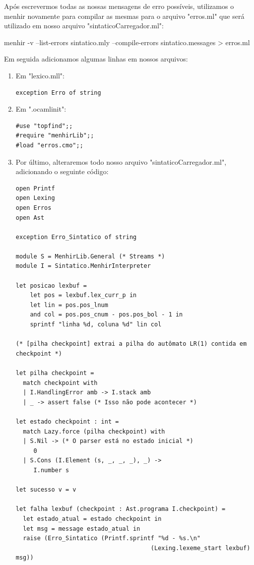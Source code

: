 \documentclass[12pt,a4paper,twoside]{report}
\begin{document}
Após escrevermos todas as nossas mensagens de erro possíveis, utilizamos o menhir novamente para compilar as mesmas para o arquivo "erros.ml" que será utilizado em nosso arquivo "sintaticoCarregador.ml":

\begin{terminal}
menhir -v --list-errors sintatico.mly --compile-errors sintatico.messages > erros.ml
\end{terminal}

Em seguida adicionamos algumas linhas em nossos arquivos:

\begin{enumerate}
\item Em "lexico.mll":
\begin{verbatim}
exception Erro of string
\end{verbatim}

\item Em ".ocamlinit":
\begin{verbatim}
#use "topfind";;
#require "menhirLib";;
#load "erros.cmo";;
\end{verbatim}

\item Por último, alteraremos todo nosso arquivo "sintaticoCarregador.ml", adicionando o seguinte código:

\begin{verbatim}
open Printf
open Lexing
open Erros
open Ast

exception Erro_Sintatico of string
    
module S = MenhirLib.General (* Streams *)
module I = Sintatico.MenhirInterpreter

let posicao lexbuf =
    let pos = lexbuf.lex_curr_p in
    let lin = pos.pos_lnum
    and col = pos.pos_cnum - pos.pos_bol - 1 in
    sprintf "linha %d, coluna %d" lin col

(* [pilha checkpoint] extrai a pilha do autômato LR(1) contida em checkpoint *)

let pilha checkpoint =
  match checkpoint with
  | I.HandlingError amb -> I.stack amb
  | _ -> assert false (* Isso não pode acontecer *)

let estado checkpoint : int =
  match Lazy.force (pilha checkpoint) with
  | S.Nil -> (* O parser está no estado inicial *)
     0
  | S.Cons (I.Element (s, _, _, _), _) ->
     I.number s

let sucesso v = v

let falha lexbuf (checkpoint : Ast.programa I.checkpoint) =
  let estado_atual = estado checkpoint in
  let msg = message estado_atual in
  raise (Erro_Sintatico (Printf.sprintf "%d - %s.\n"
                                      (Lexing.lexeme_start lexbuf) msg))


\end{verbatim}
\end{enumerate}
\end{document}
